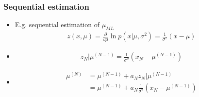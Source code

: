 \documentclass[10pt,mathserif]{beamer}
\begin{document}
\begin{frame}
\frametitle{Sequential estimation}
\begin{itemize}\itemsep=12pt
\item E.g. sequential estimation of $\mu_{ML}$
\begin{align}
    z(x,\mu) = \frac{\partial}{\partial \mu}\ln p(x|\mu,\sigma^2) = \frac{1}{\sigma^2}(x-\mu)\nonumber
\end{align}
\item 
\begin{align}
    z_N|\mu^{(N-1)} = \frac{1}{\sigma^2} (x_N- \mu^{(N-1)})\nonumber
\end{align}
\item 
\begin{align}
\mu^{(N)} &= \mu^{(N-1)} + a_Nz_N|\mu^{(N-1)}\nonumber\\
&= \mu^{(N-1)} + a_N\frac{1}{\sigma^2} (x_N- \mu^{(N-1)})\nonumber
\end{align}

\end{itemize}
\end{frame}
\end{document}
